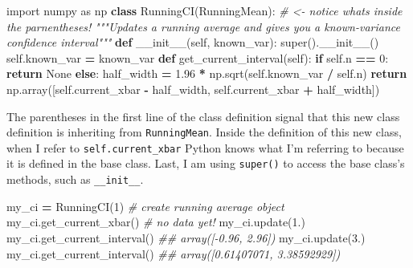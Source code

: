 \documentclass[
  12pt,
  krantz2]{krantz}
\makeatletter
\newenvironment{Shaded}{\begin{snugshade}}{\end{snugshade}}
\newcommand{\BuiltInTok}[1]{#1}
\newcommand{\CommentTok}[1]{\textcolor[rgb]{0.37,0.37,0.37}{\textit{#1}}}
\newcommand{\ControlFlowTok}[1]{\textcolor[rgb]{0.27,0.27,0.27}{\textbf{#1}}}
\newcommand{\DecValTok}[1]{\textcolor[rgb]{0.06,0.06,0.06}{#1}}
\newcommand{\FloatTok}[1]{\textcolor[rgb]{0.06,0.06,0.06}{#1}}
\newcommand{\FunctionTok}[1]{\textcolor[rgb]{0,0,0}{#1}}
\newcommand{\ImportTok}[1]{#1}
\newcommand{\KeywordTok}[1]{\textcolor[rgb]{0.27,0.27,0.27}{\textbf{#1}}}
\newcommand{\NormalTok}[1]{#1}
\newcommand{\OperatorTok}[1]{\textcolor[rgb]{0.43,0.43,0.43}{\textbf{#1}}}
\newcommand{\VariableTok}[1]{\textcolor[rgb]{0,0,0}{#1}}
\newenvironment{kframe}{%
\medskip{}
\setlength{\fboxsep}{.8em}
 \def\at@end@of@kframe{}%
 \ifinner\ifhmode%
  \def\at@end@of@kframe{\end{minipage}}%
  \begin{minipage}{\columnwidth}%
 \fi\fi%
 \def\FrameCommand##1{\hskip\@totalleftmargin \hskip-\fboxsep
 \colorbox{shadecolor}{##1}\hskip-\fboxsep
     \hskip-\linewidth \hskip-\@totalleftmargin \hskip\columnwidth}%
 \MakeFramed {\advance\hsize-\width
   \@totalleftmargin\z@ \linewidth\hsize
   \@setminipage}}%
 {\par\unskip\endMakeFramed%
 \at@end@of@kframe}
\renewenvironment{Shaded}{\begin{kframe}}{\end{kframe}}
\makeatother
\begin{document}
\begin{Shaded}
\begin{Highlighting}[]
\ImportTok{import}\NormalTok{ numpy }\ImportTok{as}\NormalTok{ np}
\KeywordTok{class}\NormalTok{ RunningCI(RunningMean): }\CommentTok{\# \textless{}{-} notice what\textquotesingle{}s inside the parnentheses!}
  \CommentTok{"""Updates a running average and gives you a known{-}variance confidence interval"""}
  \KeywordTok{def} \FunctionTok{\_\_init\_\_}\NormalTok{(}\VariableTok{self}\NormalTok{, known\_var):}
    \BuiltInTok{super}\NormalTok{().}\FunctionTok{\_\_init\_\_}\NormalTok{()}
    \VariableTok{self}\NormalTok{.known\_var }\OperatorTok{=}\NormalTok{ known\_var}
  \KeywordTok{def}\NormalTok{ get\_current\_interval(}\VariableTok{self}\NormalTok{):}
    \ControlFlowTok{if} \VariableTok{self}\NormalTok{.n }\OperatorTok{==} \DecValTok{0}\NormalTok{:}
      \ControlFlowTok{return} \VariableTok{None}
    \ControlFlowTok{else}\NormalTok{:}
\NormalTok{      half\_width }\OperatorTok{=} \FloatTok{1.96} \OperatorTok{*}\NormalTok{ np.sqrt(}\VariableTok{self}\NormalTok{.known\_var }\OperatorTok{/} \VariableTok{self}\NormalTok{.n)  }
      \ControlFlowTok{return}\NormalTok{ np.array([}\VariableTok{self}\NormalTok{.current\_xbar }\OperatorTok{{-}}\NormalTok{ half\_width, }\VariableTok{self}\NormalTok{.current\_xbar }\OperatorTok{+}\NormalTok{ half\_width])}
\end{Highlighting}
\end{Shaded}

The parentheses in the first line of the class definition signal that this new class definition is inheriting from \texttt{RunningMean}. Inside the definition of this new class, when I refer to \texttt{self.current\_xbar} Python knows what I'm referring to because it is defined in the base class. Last, I am using \texttt{super()} to access the base class's methods, such as \texttt{\_\_init\_\_}.

\begin{Shaded}
\begin{Highlighting}[]
\NormalTok{my\_ci }\OperatorTok{=}\NormalTok{ RunningCI(}\DecValTok{1}\NormalTok{) }\CommentTok{\# create running average object}
\NormalTok{my\_ci.get\_current\_xbar() }\CommentTok{\# no data yet!}
\NormalTok{my\_ci.update(}\FloatTok{1.}\NormalTok{) }
\NormalTok{my\_ci.get\_current\_interval() }
\CommentTok{\#\# array([{-}0.96,  2.96])}
\NormalTok{my\_ci.update(}\FloatTok{3.}\NormalTok{)  }
\NormalTok{my\_ci.get\_current\_interval()  }
\CommentTok{\#\# array([0.61407071, 3.38592929])}
\end{Highlighting}
\end{Shaded}
\end{document}
